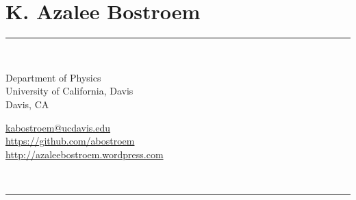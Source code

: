 \documentclass[10pt]{cv}
\begin{document}
 

\section{{\LARGE \bf{K. Azalee Bostroem}}}
{\rule{\linewidth}{0.5mm}} \\
\begin{minipage}{0.55\textwidth}
Department of Physics \\
University of California, Davis \\
Davis, CA
\end{minipage}
\begin{minipage}{0.45\textwidth}
\begin{flushright}
\vspace{0.25cm}
\color{blue}\url{kabostroem@ucdavis.edu}\\
\color{blue}\url{https://github.com/abostroem} \\
\color{blue}\url{http://azaleebostroem.wordpress.com}
\end{flushright}
\end{minipage} \\
{\rule{\linewidth}{0.5mm}} 
\vspace{-.5em}
\end{document}
